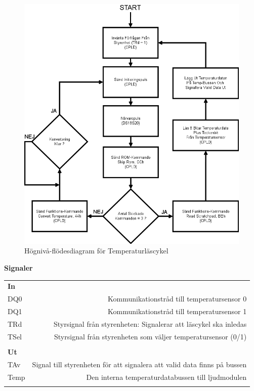 \documentclass[a4paper,11pt]{article}
\begin{document}
	\begin{figure}[h!tb]
	  \centering
	      \includegraphics[scale=0.5, angle=0]{ReadCycleFlowChart.png}
	  	\caption{Högnivå-flödesdiagram för Temperaturläscykel}
	\end{figure}

{\noindent \bf Signaler}

	\begin{tabular}{l r}
		\\{\bf In} &  \\
		DQ0 & Kommunikationstråd till temperatursensor 0\\
		DQ1 & Kommunikationstråd till temperatursensor 1\\
		TRd & Styrsignal från styrenheten: Signalerar att läscykel ska inledas\\
		TSel & Styrsignal från styrenheten som väljer temperatursensor (0/1)\\\\
		{\bf Ut} &  \\
		TAv & Signal till styrenheten för att signalera att valid data finns på bussen\\
		Temp & Den interna temperaturdatabussen till ljudmodulen\\\\
	\end{tabular}
\end{document}

